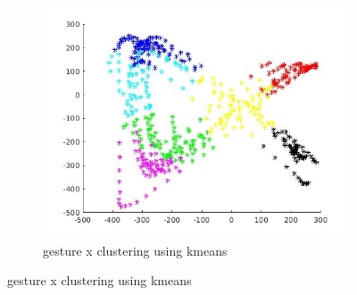 \documentclass{article}
\begin{document}
\begin{figure}[ht]
	\begin{subfigure}{.5\textwidth}
		\centering
		\includegraphics[width=1.\linewidth]{kmean3.jpg}  
		\caption{gesture x clustering using kmeans}
	\end{subfigure}
\end{figure}
\end{document}
